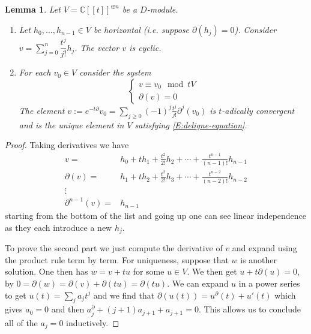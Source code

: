 \documentclass[12pt]{book}
\numberwithin{equation}{section}
\newtheorem{lemma}[theorem]{Lemma}
\theoremstyle{definition}
\theoremstyle{remark}
\newcommand{\CC}{\mathbb{C}}
\begin{document}
\begin{lemma}\label{L:katz}
	Let $V=\CC[[t]]^{\oplus n}$ be a $D$-module. 
	\begin{enumerate}
		\item Let $h_0,\ldots,h_{n-1} \in V$ be horizontal (i.e. suppose $\partial(h_j)=0$). 
		Consider  $v=\sum_{j=0}^n \dfrac{t^j}{j!}h_j.$
		The vector $v$ is cyclic. 
		\item For each $v_0\in V$ consider the system 
		\begin{equation}\label{E:deligne-equation}
		\begin{cases}
		v \equiv v_0 \mod tV \\
		\partial(v) =0 
		\end{cases}
		\end{equation}
		The element  $v:= e^{-t\partial}v_0 = \sum_{j\geq 0}(-1)^j \frac{t^j}{j!}\partial^j(v_0)$
		is $t$-adically convergent and is the unique element in $V$ satisfying \eqref{E:deligne-equation}.
	\end{enumerate}
\end{lemma}
\begin{proof}
	Taking derivatives we have 
	\begin{align*}
	v=& h_0 + t h_1 + \frac{t^2}{2!} h_2 + \cdots + \frac{t^{n-1}}{(n-1)!}h_{n-1}\\
	\partial(v) =& h_1 + t h_2 + \frac{t^2}{2!} h_3+ \cdots + \frac{t^{n-2}}{(n-2)!}h_{n-2} \\
	\vdots & \\
	\partial^{n-1}(v) =& h_{n-1}
	\end{align*}
	starting from the bottom of the list and going up one can see linear independence as they each introduce a new $h_j$.
	
	To prove the second part we just compute the derivative of $v$ and expand using the product rule term by term. 
	For uniqueness, suppose that $w$ is another solution. 
	One then has $w=v+tu$ for some $u\in V$. 
	We then get $u+t\partial(u)=0$, by $0 = \partial(w) = \partial(v) + \partial(tu) = \partial(tu)$. 
	We can expand $u$ in a power series to get $u(t) = \sum_j a_j t^j$ and we find that $\partial(u(t)) = u^{\partial}(t) +u'(t)$ which gives $a_0=0$ and then $a_j^{\partial}+(j+1)a_{j+1} +a_{j+1}=0$. 
	This allows us to conclude all of the $a_j=0$ inductively. 
\end{proof}
\end{document}
